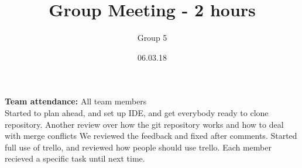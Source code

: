 \documentclass{article}
\title{Group Meeting - 2 hours}
\author{Group 5}
\date{06.03.18}
\begin{document}
	\maketitle
	\noindent
	\textbf{Team attendance:} All team members \\

	\noindent
	Started to plan ahead, and set up IDE, and get everybody ready to clone repository.
	Another review over how the git repository works and how to deal with merge conflicts
	We reviewed the feedback and fixed after comments. Started full use of trello,
	and reviewed how people should use trello. Each member recieved a specific task
	until next time. 
\end{document}
